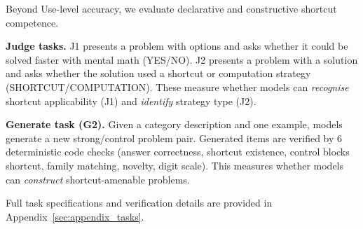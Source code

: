 Beyond Use-level accuracy, we evaluate declarative and constructive shortcut competence.

\textbf{Judge tasks.} J1 presents a problem with options and asks whether it could be solved faster with mental math (YES/NO). J2 presents a problem with a solution and asks whether the solution used a shortcut or computation strategy (SHORTCUT/COMPUTATION). These measure whether models can \emph{recognise} shortcut applicability (J1) and \emph{identify} strategy type (J2).

\textbf{Generate task (G2).} Given a category description and one example, models generate a new strong/control problem pair. Generated items are verified by 6 deterministic code checks (answer correctness, shortcut existence, control blocks shortcut, family matching, novelty, digit scale). This measures whether models can \emph{construct} shortcut-amenable problems.

Full task specifications and verification details are provided in Appendix~\ref{sec:appendix_tasks}.
